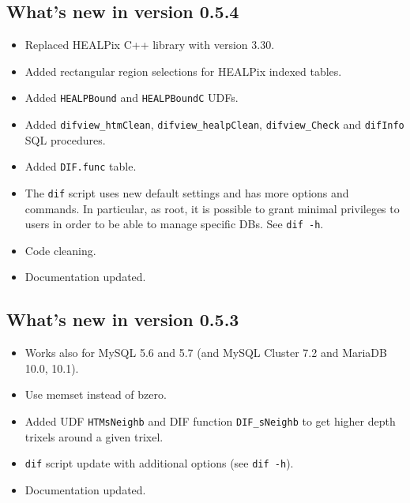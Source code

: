 \documentclass[10pt,titlepage]{article}
\begin{document}
\subsection{What's new in version 0.5.4}
\begin{itemize}
\item Replaced HEALPix C++ library with version 3.30.
\item Added rectangular region selections for HEALPix indexed tables.
\item Added \texttt{HEALPBound} and \texttt{HEALPBoundC} UDFs.
\item Added \texttt{difview\_htmClean}, \texttt{difview\_healpClean},
 \texttt{difview\_Check} and \texttt{difInfo} SQL procedures.
\item Added \texttt{DIF.func} table.
\item The \texttt{dif} script uses new default settings and has more options
 and commands. In particular, as root, it is possible to grant minimal
 privileges to users in order to be able to manage specific DBs.
 See \texttt{dif -h}.
\item Code cleaning.
\item Documentation updated.
\end{itemize}


\subsection{What's new in version 0.5.3}
\begin{itemize}
\item  Works also for MySQL 5.6 and 5.7 (and MySQL Cluster 7.2 and MariaDB 10.0, 10.1).
\item  Use memset instead of bzero.
\item  Added UDF \texttt{HTMsNeighb} and DIF function \texttt{DIF\_sNeighb}
  to get higher depth trixels around a given trixel.
\item  \texttt{dif} script update with additional options (see \texttt{dif -h}).
\item  Documentation updated.
\end{itemize}
\end{document}
